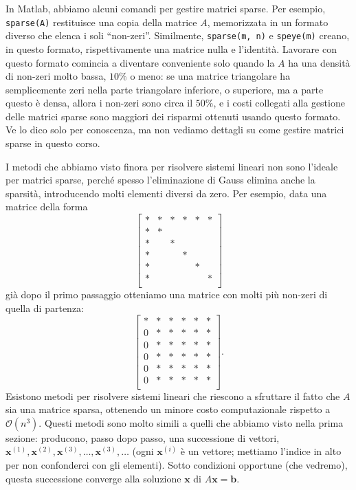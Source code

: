 \documentclass[a4paper]{report}
\theoremstyle{definiton}
\theoremstyle{remark}
\newcommand{\x}{\mathbf{x}}
\renewcommand{\b}{\mathbf{b}}
\begin{document}
In Matlab, abbiamo alcuni comandi per gestire matrici sparse. Per esempio, \lstinline{sparse(A)} restituisce una copia della matrice $A$, memorizzata in un formato diverso che elenca i soli ``non-zeri''. Similmente, \lstinline{sparse(m, n)} e \lstinline{speye(m)} creano, in questo formato, rispettivamente una matrice nulla e l'identità. Lavorare con questo formato comincia a diventare conveniente solo quando la $A$ ha una densità di non-zeri molto bassa, $10\%$ o meno: se una matrice triangolare ha semplicemente zeri nella parte triangolare inferiore, o superiore, ma a parte questo è densa, allora i non-zeri sono circa il $50\%$, e i costi collegati alla gestione delle matrici sparse sono maggiori dei risparmi ottenuti usando questo formato. Ve lo dico solo per conoscenza, ma non vediamo dettagli su come gestire matrici sparse in questo corso.

I metodi che abbiamo visto finora per risolvere sistemi lineari non sono l'ideale per matrici sparse, perché spesso l'eliminazione di Gauss elimina anche la sparsità, introducendo molti elementi diversi da zero. Per esempio, data una matrice della forma
\[
\begin{bmatrix}
    * & * & * & * & * & *\\
    * & * \\
    * & & *\\
    * & & &*\\
    * & & & & *\\
    * & & & & & *\\
\end{bmatrix}
\]
già dopo il primo passaggio otteniamo una matrice con molti più non-zeri di quella di partenza:
\[
\begin{bmatrix}
    * & * & * & * & * & *\\
    0 & * & * & * & * & *\\
    0 & * & * & * & * & *\\
    0 & * & * & * & * & *\\
    0 & * & * & * & * & *\\
    0 & * & * & * & * & *\\
\end{bmatrix}.
\]
Esistono metodi per risolvere sistemi lineari che riescono a sfruttare il fatto che $A$ sia una matrice sparsa, ottenendo un minore costo computazionale rispetto a $\mathcal{O}(n^3)$. Questi metodi sono molto simili a quelli che abbiamo visto nella prima sezione: producono, passo dopo passo, una successione di vettori, $\x^{(1)}, \x^{(2)}, \x^{(3)},\dots,\x^{(3)}, \dots$ (ogni $\x^{(i)}$ è un vettore; mettiamo l'indice in alto per non confonderci con gli elementi). Sotto condizioni opportune (che vedremo), questa successione converge alla soluzione $\x$ di $A\x=\b$.
\end{document}
